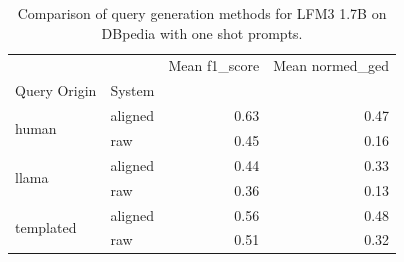 \begin{table}
\caption{Comparison of query generation methods for LFM3 1.7B on DBpedia with one shot prompts.}
\label{tab:compare_gen_query}
\begin{tabular}{llrr}
\toprule
 &  & Mean f1_score & Mean normed_ged \\
Query Origin & System &  &  \\
\midrule
\multirow[t]{2}{*}{human} & aligned & 0.63 & 0.47 \\
 & raw & 0.45 & 0.16 \\
\cline{1-4}
\multirow[t]{2}{*}{llama} & aligned & 0.44 & 0.33 \\
 & raw & 0.36 & 0.13 \\
\cline{1-4}
\multirow[t]{2}{*}{templated} & aligned & 0.56 & 0.48 \\
 & raw & 0.51 & 0.32 \\
\cline{1-4}
\bottomrule
\end{tabular}
\end{table}
